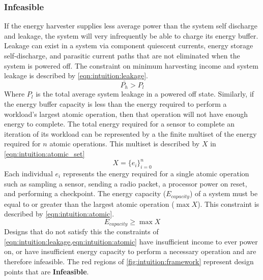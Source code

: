 \subsubsection{Infeasible} 
If the energy harvester supplies less average power than
the system self discharge and leakage, the system will very infrequently be able to charge its energy buffer.
Leakage can exist in a system via component quiescent currents, energy storage self-discharge, and parasitic current paths that are not eliminated when the system is powered off. 
The constraint on minimum harvesting income and system leakage is described by \cref{eqn:intuition:leakage}.
\begin{equation}
    \label{eqn:intuition:leakage}
    \bar{P_h} > P_l
\end{equation}
Where $P_l$ is the total average system leakage in a powered off state.
Similarly, if the energy buffer capacity is less than the
energy required to perform a workload's largest atomic operation, 
then that operation will not have enough energy to
complete.
The total energy required for a sensor to complete an iteration of its workload can be represented by a the finite multiset of the energy required for $n$ atomic operations. This multiset is described by $X$ in \cref{eqn:intuition:atomic_set}%
\begin{equation} \label{eqn:intuition:atomic_set}
    X = \{e_i\}_{i=0}^n 
\end{equation}
Each individual $e_{i}$ represents the energy required for a single atomic operation such as sampling a sensor,
sending a radio packet, a processor power on reset, and performing a checkpoint.
The energy capacity ($E_{capacity}$) of a system must be equal to or greater than the largest atomic operation ($\max X$). 
This constraint is described by  \cref{eqn:intuition:atomic}.
\begin{equation}
    \label{eqn:intuition:atomic}
    E_{capacity} \geq \max X
\end{equation}
Designs that do not satisfy this the constraints of \cref{eqn:intuition:leakage,eqn:intuition:atomic} have insufficient income to ever power on, or have insufficient energy capacity to perform a necessary operation and are  
therefore infeasible.
The red regions of \cref{fig:intuition:framework} represent design points that are \textbf{Infeasible}. 


